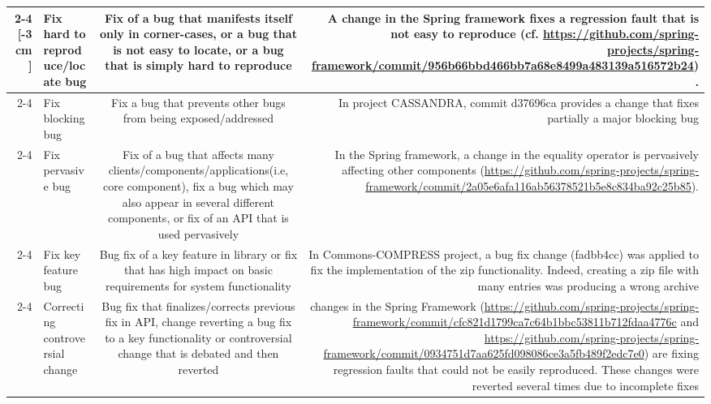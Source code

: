 \begin{table}
\scriptsize
	\begin{tabular} {r |l | c | r}
	\cline{2-4}
	\multirow{5}{*}[-3cm]{\rotatebox[origin=r]{90}{Corrective changes}} &Fix hard to reproduce/locate bug & \multicolumn{1}{p{4cm}|}{Fix of a bug that manifests itself only in corner-cases, or a bug that is not easy to locate, or a bug that is simply hard to reproduce} & \multicolumn{1}{p{5.5cm}}{A change in the Spring framework fixes a regression fault that is not easy to reproduce (cf. {\tiny \url{https://github.com/spring-projects/spring-framework/commit/956b66bbd466bb7a68e8499a483139a516572b24}}).}\\\cline{2-4}
&Fix blocking bug & \multicolumn{1}{p{4cm}|}{Fix a bug that prevents other bugs from being exposed/addressed} & \multicolumn{1}{p{5.5cm}}{In project CASSANDRA, commit d37696ca provides a change that fixes partially a major blocking bug}\\ \cline{2-4}
	&Fix pervasive bug & \multicolumn{1}{p{4cm}|}{Fix of a bug that affects many clients/components/applications(i.e, core component),  fix a bug which may also appear in several different components, or  fix of an API that is used pervasively} & \multicolumn{1}{p{5.5cm}}{In the Spring framework, a change in the equality operator is pervasively affecting other components ({\tiny \url{https://github.com/spring-projects/spring-framework/commit/2a05e6afa116ab56378521b5e8c834ba92c25b85}}).}\\ \cline{2-4}
	&Fix key feature bug & \multicolumn{1}{p{4cm}|}{Bug fix of a key feature in library or fix that has high impact on basic requirements for system functionality}& \multicolumn{1}{p{5.5cm}}{In Commons-COMPRESS project, a bug fix change (fadbb4cc) was applied to fix the implementation of the zip functionality. Indeed, creating a zip file with many entries was producing a wrong archive}\\ \cline{2-4}
	&Correcting controversial change & \multicolumn{1}{p{4cm}|}{Bug fix that finalizes/corrects previous fix in API, change reverting a bug fix to a key functionality or controversial change that is debated and then reverted} &  \multicolumn{1}{p{5.5cm}}{changes in the Spring Framework ({\tiny \url{https://github.com/spring-projects/spring-framework/commit/cfc821d1799ca7c64b1bbc53811b712fdaa4776c}} and  {\tiny \url{https://github.com/spring-projects/spring-framework/commit/0934751d7aa625fd098086ce3a5fb489f2edc7e0}}) are fixing regression faults that could not be easily reproduced. These changes were reverted several times due to incomplete fixes}\\ \hline \hline
		
	\end{tabular}
	\label{tab:ics}
\end{table}


